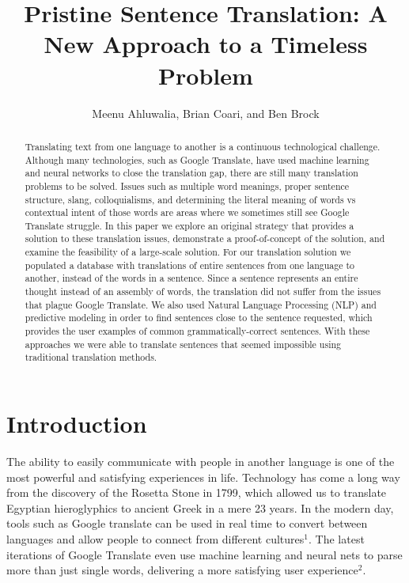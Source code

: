 \documentclass{llncs}
\title{Pristine Sentence Translation: A New Approach to a Timeless Problem}
\author{
	Meenu Ahluwalia, Brian Coari, and Ben Brock
}
\institute{$^1$Master of Science in Data Science \\ Southern Methodist University \\ Dallas, Texas USA \\
	\email{\{mahluwalia, bcoari, bbrock\}@smu.edu}}
\begin{document}
	
	\maketitle
	
	\begin{abstract}
		Translating text from one language to another is a continuous technological challenge. Although many technologies, such as Google Translate, have used machine learning and neural networks to close the translation gap, there are still many translation problems to be solved. Issues such as multiple word meanings, proper sentence structure, slang, colloquialisms, and determining the literal meaning of words vs contextual intent of those words are areas where we sometimes still see Google Translate struggle. In this paper we explore an original strategy that provides a solution to these translation issues, demonstrate a proof-of-concept of the solution, and examine the feasibility of a large-scale solution. For our translation solution we populated a database with translations of entire sentences from one language to another, instead of the words in a sentence. Since a sentence represents an entire thought instead of an assembly of words, the translation did not suffer from the issues that plague Google Translate. We also used Natural Language Processing (NLP) and predictive modeling in order to find sentences close to the sentence requested, which provides the user examples of common grammatically-correct sentences. With these approaches we were able to translate sentences that seemed impossible using traditional translation methods.
		
	\end{abstract}
	
	
	\section{Introduction}
	
	The ability to easily communicate with people in another language is one of the most powerful and satisfying experiences in life. Technology has come a long way from the discovery of the Rosetta Stone in 1799, which allowed us to translate Egyptian hieroglyphics to ancient Greek in a mere 23 years. In the modern day, tools such as Google translate can be used in real time to convert between languages and allow people to connect from different cultures$^1$. The latest iterations of Google Translate even use machine learning and neural nets to parse more than just  single words, delivering a more satisfying user experience$^2$.
	
\end{document}
